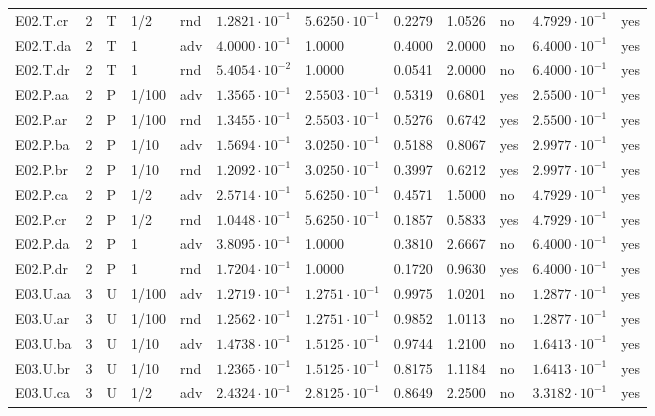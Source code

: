{\begin{longtable}{@{}lllllllllll l@{}}
E02.T.cr & 2 & T & 1/2 & rnd & $1.2821\cdot 10^{-1}$ & $5.6250\cdot 10^{-1}$ & 0.2279 & 1.0526 & no & $4.7929\cdot 10^{-1}$ & yes \\
E02.T.da & 2 & T & 1 & adv & $4.0000\cdot 10^{-1}$ & 1.0000 & 0.4000 & 2.0000 & no & $6.4000\cdot 10^{-1}$ & yes \\
E02.T.dr & 2 & T & 1 & rnd & $5.4054\cdot 10^{-2}$ & 1.0000 & 0.0541 & 2.0000 & no & $6.4000\cdot 10^{-1}$ & yes \\
E02.P.aa & 2 & P & 1/100 & adv & $1.3565\cdot 10^{-1}$ & $2.5503\cdot 10^{-1}$ & 0.5319 & 0.6801 & yes & $2.5500\cdot 10^{-1}$ & yes \\
E02.P.ar & 2 & P & 1/100 & rnd & $1.3455\cdot 10^{-1}$ & $2.5503\cdot 10^{-1}$ & 0.5276 & 0.6742 & yes & $2.5500\cdot 10^{-1}$ & yes \\
E02.P.ba & 2 & P & 1/10 & adv & $1.5694\cdot 10^{-1}$ & $3.0250\cdot 10^{-1}$ & 0.5188 & 0.8067 & yes & $2.9977\cdot 10^{-1}$ & yes \\
E02.P.br & 2 & P & 1/10 & rnd & $1.2092\cdot 10^{-1}$ & $3.0250\cdot 10^{-1}$ & 0.3997 & 0.6212 & yes & $2.9977\cdot 10^{-1}$ & yes \\
E02.P.ca & 2 & P & 1/2 & adv & $2.5714\cdot 10^{-1}$ & $5.6250\cdot 10^{-1}$ & 0.4571 & 1.5000 & no & $4.7929\cdot 10^{-1}$ & yes \\
E02.P.cr & 2 & P & 1/2 & rnd & $1.0448\cdot 10^{-1}$ & $5.6250\cdot 10^{-1}$ & 0.1857 & 0.5833 & yes & $4.7929\cdot 10^{-1}$ & yes \\
E02.P.da & 2 & P & 1 & adv & $3.8095\cdot 10^{-1}$ & 1.0000 & 0.3810 & 2.6667 & no & $6.4000\cdot 10^{-1}$ & yes \\
E02.P.dr & 2 & P & 1 & rnd & $1.7204\cdot 10^{-1}$ & 1.0000 & 0.1720 & 0.9630 & yes & $6.4000\cdot 10^{-1}$ & yes \\
E03.U.aa & 3 & U & 1/100 & adv & $1.2719\cdot 10^{-1}$ & $1.2751\cdot 10^{-1}$ & 0.9975 & 1.0201 & no & $1.2877\cdot 10^{-1}$ & yes \\
E03.U.ar & 3 & U & 1/100 & rnd & $1.2562\cdot 10^{-1}$ & $1.2751\cdot 10^{-1}$ & 0.9852 & 1.0113 & no & $1.2877\cdot 10^{-1}$ & yes \\
E03.U.ba & 3 & U & 1/10 & adv & $1.4738\cdot 10^{-1}$ & $1.5125\cdot 10^{-1}$ & 0.9744 & 1.2100 & no & $1.6413\cdot 10^{-1}$ & yes \\
E03.U.br & 3 & U & 1/10 & rnd & $1.2365\cdot 10^{-1}$ & $1.5125\cdot 10^{-1}$ & 0.8175 & 1.1184 & no & $1.6413\cdot 10^{-1}$ & yes \\
E03.U.ca & 3 & U & 1/2 & adv & $2.4324\cdot 10^{-1}$ & $2.8125\cdot 10^{-1}$ & 0.8649 & 2.2500 & no & $3.3182\cdot 10^{-1}$ & yes \\

\end{longtable}}
